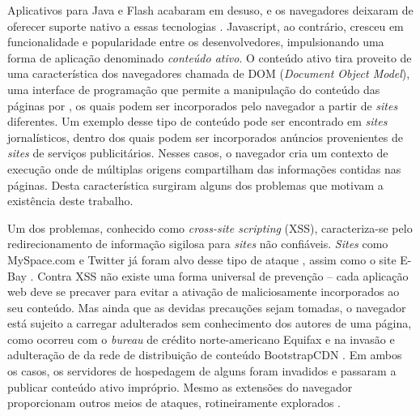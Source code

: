 Aplicativos para Java e Flash acabaram em desuso, e os navegadores deixaram de oferecer suporte nativo a essas tecnologias \cite{Verge2016, Adobe2017}. Javascript, ao contrário, cresceu em funcionalidade e popularidade entre os desenvolvedores, impulsionando uma forma de aplicação denominado \textit{conteúdo ativo}. O conteúdo ativo tira proveito de uma característica dos navegadores chamada de DOM (\textit{Document Object Model}), uma interface de programação que permite a manipulação do conteúdo das páginas por \scripts, os quais podem ser incorporados pelo navegador a partir de \textit{sites} diferentes. Um exemplo desse tipo de conteúdo pode ser encontrado em \textit{sites} jornalísticos, dentro dos quais podem ser incorporados anúncios provenientes de \textit{sites} de serviços publicitários. Nesses casos, o navegador cria um contexto de execução onde \scripts de múltiplas origens compartilham das informações contidas nas páginas. Desta característica surgiram alguns dos problemas que motivam a existência deste trabalho.

Um dos problemas, conhecido como \textit{cross-site scripting} (XSS), caracteriza-se pelo redirecionamento de informação sigilosa para \textit{sites} não confiáveis. \textit{Sites} como MySpace.com e Twitter já foram alvo desse tipo de ataque \cite{IBM2017}, assim como o site E-Bay \cite{Vanunu2016}. Contra XSS não existe uma forma universal de prevenção -- cada aplicação web deve se precaver para evitar a ativação de \scripts maliciosamente incorporados ao seu conteúdo. Mas ainda que as devidas precauções sejam tomadas, o navegador está sujeito a carregar \scripts adulterados sem conhecimento dos autores de uma página, como ocorreu com o \textit{bureau} de crédito norte-americano Equifax \cite{Segura2017} e na invasão e adulteração de \scripts da rede de distribuição de conteúdo BootstrapCDN \cite{Dorfman2013}. Em ambos os casos, os servidores de hospedagem de alguns \scripts foram invadidos e passaram a publicar conteúdo ativo impróprio. Mesmo as extensões do navegador proporcionam outros meios de ataques, rotineiramente explorados \cite{Forrest2017}.

